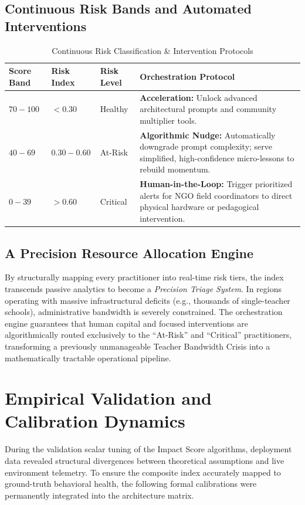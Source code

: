 \documentclass[11pt,a4paper]{article}
\begin{document}
\subsection{Continuous Risk Bands and Automated Interventions}

\begin{table}[H]
    \centering
    \caption{Continuous Risk Classification \& Intervention Protocols}
    \begin{tabular}{p{2cm} p{2cm} p{2cm} p{8cm}}
        \toprule
        \textbf{Score Band} & \textbf{Risk Index} & \textbf{Risk Level} & \textbf{Orchestration Protocol} \\
        \midrule
        $70-100$ & $< 0.30$ & Healthy & \textbf{Acceleration:} Unlock advanced architectural prompts and community multiplier tools. \\
        $40-69$ & $0.30 - 0.60$ & At-Risk & \textbf{Algorithmic Nudge:} Automatically downgrade prompt complexity; serve simplified, high-confidence micro-lessons to rebuild momentum. \\
        $0-39$ & $> 0.60$ & Critical & \textbf{Human-in-the-Loop:} Trigger prioritized alerts for NGO field coordinators to direct physical hardware or pedagogical intervention. \\
        \bottomrule
    \end{tabular}
\end{table}

\subsection{A Precision Resource Allocation Engine}
By structurally mapping every practitioner into real-time risk tiers, the index transcends passive analytics to become a \textit{Precision Triage System}. In regions operating with massive infrastructural deficits (e.g., thousands of single-teacher schools), administrative bandwidth is severely constrained. The orchestration engine guarantees that human capital and focused interventions are algorithmically routed exclusively to the ``At-Risk'' and ``Critical'' practitioners, transforming a previously unmanageable Teacher Bandwidth Crisis into a mathematically tractable operational pipeline.

\section{Empirical Validation and Calibration Dynamics}

During the validation scalar tuning of the Impact Score algorithms, deployment data revealed structural divergences between theoretical assumptions and live environment telemetry. To ensure the composite index accurately mapped to ground-truth behavioral health, the following formal calibrations were permanently integrated into the architecture matrix.
\end{document}
